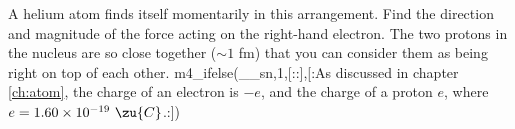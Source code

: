 A helium atom finds itself momentarily in this
        arrangement.  Find the direction and magnitude of the force
        acting on the right-hand electron.  The two protons in the
        nucleus are so close together ($\sim1$ fm) that you can
        consider them as being right on top of each other.
m4_ifelse(__sn,1,[::],[:As discussed in chapter \ref{ch:atom}, the
charge of an electron is $-e$, and the charge of a proton $e$,
where $e=1.60\times10^{-19}\ \zu{C}$.:])
\answercheck
